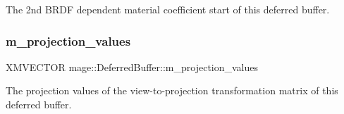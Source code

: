 The 2nd B\+R\+DF dependent material coefficient start of this deferred buffer. \hypertarget{structmage_1_1_deferred_buffer_a7af6a3b361e4cfa5c29349b4a6b2823b}{}\label{structmage_1_1_deferred_buffer_a7af6a3b361e4cfa5c29349b4a6b2823b} 
\subsubsection{\texorpdfstring{m\+\_\+projection\+\_\+values}{m\_projection\_values}}
{\footnotesize\ttfamily X\+M\+V\+E\+C\+T\+OR mage\+::\+Deferred\+Buffer\+::m\+\_\+projection\+\_\+values}

The projection values of the view-\/to-\/projection transformation matrix of this deferred buffer. 